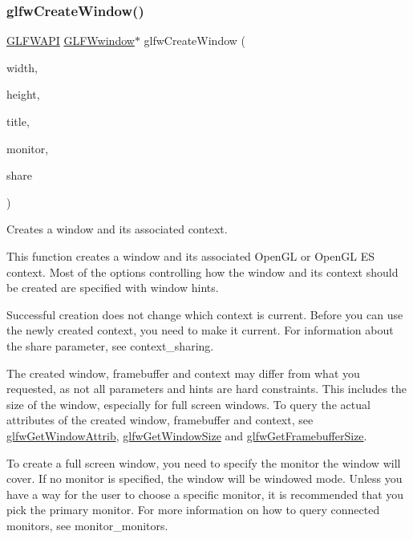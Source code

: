 \subsubsection{\texorpdfstring{glfwCreateWindow()}{glfwCreateWindow()}}
{\footnotesize\ttfamily \mbox{\hyperlink{glfw3_8h_a56da5036b2cc259351ae22fd6439bb47}{G\+L\+F\+W\+A\+PI}} \mbox{\hyperlink{group__window_ga3c96d80d363e67d13a41b5d1821f3242}{G\+L\+F\+Wwindow}}$\ast$ glfw\+Create\+Window (\begin{DoxyParamCaption}\item[{int}]{width,  }\item[{int}]{height,  }\item[{const char $\ast$}]{title,  }\item[{\mbox{\hyperlink{group__monitor_ga8d9efd1cde9426692c73fe40437d0ae3}{G\+L\+F\+Wmonitor}} $\ast$}]{monitor,  }\item[{\mbox{\hyperlink{group__window_ga3c96d80d363e67d13a41b5d1821f3242}{G\+L\+F\+Wwindow}} $\ast$}]{share }\end{DoxyParamCaption})}



Creates a window and its associated context. 

This function creates a window and its associated Open\+GL or Open\+GL ES context. Most of the options controlling how the window and its context should be created are specified with window hints.

Successful creation does not change which context is current. Before you can use the newly created context, you need to make it current. For information about the {\ttfamily share} parameter, see context\+\_\+sharing.

The created window, framebuffer and context may differ from what you requested, as not all parameters and hints are hard constraints. This includes the size of the window, especially for full screen windows. To query the actual attributes of the created window, framebuffer and context, see \mbox{\hyperlink{group__window_ga1bb0c7e100418e284dbb800789c63d40}{glfw\+Get\+Window\+Attrib}}, \mbox{\hyperlink{group__window_ga7feb769ebb3f3d21579b5a3fb07be76e}{glfw\+Get\+Window\+Size}} and \mbox{\hyperlink{group__window_gaf7d17f3534b4b6dc9a6f905e3a240b7e}{glfw\+Get\+Framebuffer\+Size}}.

To create a full screen window, you need to specify the monitor the window will cover. If no monitor is specified, the window will be windowed mode. Unless you have a way for the user to choose a specific monitor, it is recommended that you pick the primary monitor. For more information on how to query connected monitors, see monitor\+\_\+monitors.

